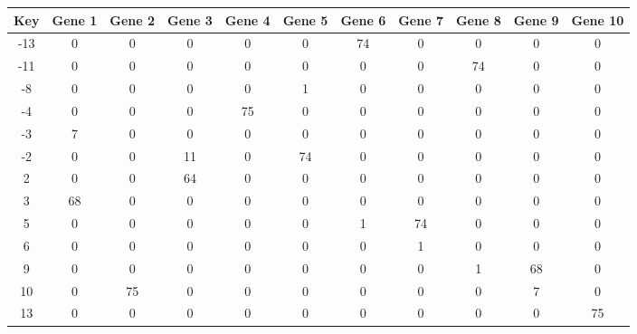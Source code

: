 \begin{tabular}{|c|c|c|c|c|c|c|c|c|c|c|}
\hline
Key & Gene 1 & Gene 2 & Gene 3 & Gene 4 & Gene 5 & Gene 6 & Gene 7 & Gene 8 & Gene 9 & Gene 10 \\
\hline
-13 & 0 & 0 & 0 & 0 & 0 & 74 & 0 & 0 & 0 & 0 \\
-11 & 0 & 0 & 0 & 0 & 0 & 0 & 0 & 74 & 0 & 0 \\
-8 & 0 & 0 & 0 & 0 & 1 & 0 & 0 & 0 & 0 & 0 \\
-4 & 0 & 0 & 0 & 75 & 0 & 0 & 0 & 0 & 0 & 0 \\
-3 & 7 & 0 & 0 & 0 & 0 & 0 & 0 & 0 & 0 & 0 \\
-2 & 0 & 0 & 11 & 0 & 74 & 0 & 0 & 0 & 0 & 0 \\
2 & 0 & 0 & 64 & 0 & 0 & 0 & 0 & 0 & 0 & 0 \\
3 & 68 & 0 & 0 & 0 & 0 & 0 & 0 & 0 & 0 & 0 \\
5 & 0 & 0 & 0 & 0 & 0 & 1 & 74 & 0 & 0 & 0 \\
6 & 0 & 0 & 0 & 0 & 0 & 0 & 1 & 0 & 0 & 0 \\
9 & 0 & 0 & 0 & 0 & 0 & 0 & 0 & 1 & 68 & 0 \\
10 & 0 & 75 & 0 & 0 & 0 & 0 & 0 & 0 & 7 & 0 \\
13 & 0 & 0 & 0 & 0 & 0 & 0 & 0 & 0 & 0 & 75 \\
\hline
\end{tabular}